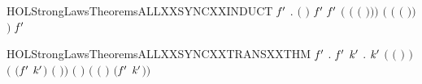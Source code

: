 \newcommand{\HOLStrongLawsTheoremsALLXXSYNCXXcompute}{\UseVerbatim{HOLStrongLawsTheoremsALLXXSYNCXXcompute}}
\begin{SaveVerbatim}{HOLStrongLawsTheoremsALLXXSYNCXXINDUCT}
\HOLTokenTurnstile{} \HOLSymConst{\HOLTokenForall{}}  \ensuremath{\HOLBoundVar{f}\sp{\prime{}}} .
       \ensuremath{(} \ensuremath{)} \ensuremath{\HOLBoundVar{f}\sp{\prime{}}}  \HOLSymConst{\ensuremath{=}}
        \ensuremath{\HOLBoundVar{f}\sp{\prime{}}}  \HOLSymConst{\ensuremath{+}}
      \ensuremath{(} \ensuremath{(} \ensuremath{(} \ensuremath{)}\ensuremath{)}\ensuremath{)} \ensuremath{(} \ensuremath{(} \ensuremath{(} \ensuremath{)}\ensuremath{)}\ensuremath{)} \ensuremath{\HOLBoundVar{f}\sp{\prime{}}} 
\end{SaveVerbatim}
\newcommand{\HOLStrongLawsTheoremsALLXXSYNCXXINDUCT}{\UseVerbatim{HOLStrongLawsTheoremsALLXXSYNCXXINDUCT}}
\begin{SaveVerbatim}{HOLStrongLawsTheoremsALLXXSYNCXXTRANSXXTHM}
\HOLTokenTurnstile{} \HOLSymConst{\HOLTokenForall{}}   \ensuremath{\HOLBoundVar{f}\sp{\prime{}}}  .
        \ensuremath{\HOLBoundVar{f}\sp{\prime{}}}  \HOLTokenTransBegin{}\HOLTokenTransEnd {} \HOLSymConst{\HOLTokenImp{}}
     \HOLSymConst{\HOLTokenExists{}} \ensuremath{\HOLBoundVar{k}\sp{\prime{}}} .
        \HOLSymConst{\HOLTokenLeq{}}  \HOLSymConst{\HOLTokenConj{}} \ensuremath{\HOLBoundVar{k}\sp{\prime{}}} \HOLSymConst{\HOLTokenLeq{}}  \HOLSymConst{\HOLTokenConj{}} \ensuremath{(} \ensuremath{(} \ensuremath{)} \HOLSymConst{\ensuremath{=}}  \ensuremath{)} \HOLSymConst{\HOLTokenConj{}}
       \ensuremath{(} \ensuremath{(}\ensuremath{\HOLBoundVar{f}\sp{\prime{}}} \ensuremath{\HOLBoundVar{k}\sp{\prime{}}}\ensuremath{)} \HOLSymConst{\ensuremath{=}}  \ensuremath{(} \ensuremath{)}\ensuremath{)} \HOLSymConst{\HOLTokenConj{}} \ensuremath{(} \HOLSymConst{\ensuremath{=}} \HOLConst{\ensuremath{\tau}}\ensuremath{)} \HOLSymConst{\HOLTokenConj{}}
       \ensuremath{(} \HOLSymConst{\ensuremath{=}}  \ensuremath{(} \ensuremath{)} \HOLSymConst{\ensuremath{\mid}}  \ensuremath{(}\ensuremath{\HOLBoundVar{f}\sp{\prime{}}} \ensuremath{\HOLBoundVar{k}\sp{\prime{}}}\ensuremath{)}\ensuremath{)}
\end{SaveVerbatim}
